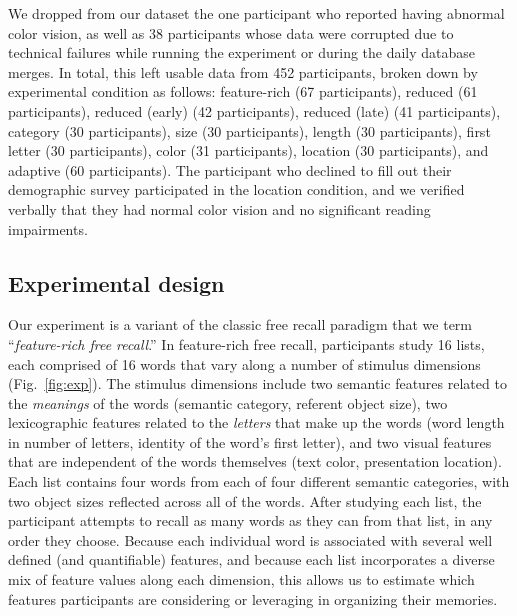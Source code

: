\documentclass[11pt]{article}
\begin{document}
We dropped from our dataset the one participant who reported having abnormal
color vision, as well as 38 participants whose data were corrupted due to
technical failures while running the experiment or during the daily database
merges. In total, this left usable data from 452 participants, broken down by
experimental condition as follows: feature-rich (67 participants), reduced (61
participants), reduced (early) (42 participants), reduced (late) (41
participants), category (30 participants), size (30 participants), length (30
participants), first letter (30 participants), color (31 participants),
location (30 participants), and adaptive (60 participants). The participant who
declined to fill out their demographic survey participated in the location
condition, and we verified verbally that they had normal color vision and no
significant reading impairments.




\subsection*{Experimental design}

Our experiment is a variant of the classic free recall paradigm that we term
``\textit{feature-rich free recall}.'' In feature-rich free recall,
participants study 16 lists, each comprised of 16 words that vary along a
number of stimulus dimensions (Fig.~\ref{fig:exp}). The stimulus dimensions
include two semantic features related to the \textit{meanings} of the words
(semantic category, referent object size), two lexicographic features related
to the \textit{letters} that make up the words (word length in number of
letters, identity of the word's first letter), and two visual features that are
independent of the words themselves (text color, presentation location). Each
list contains four words from each of four different semantic categories, with
two object sizes reflected across all of the words. After studying each list,
the participant attempts to recall as many words as they can from that list, in
any order they choose. Because each individual word is associated with several
well defined (and quantifiable) features, and because each list incorporates a
diverse mix of feature values along each dimension, this allows us to estimate
which features participants are considering or leveraging in organizing their
memories.
\end{document}
